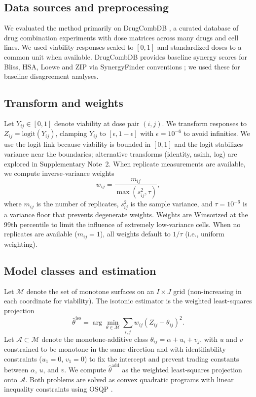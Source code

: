 \documentclass[pdflatex,sn-nature]{sn-jnl}%
\begin{document}
\subsection{Data sources and preprocessing}
We evaluated the method primarily on DrugCombDB \cite{DrugCombDB2020}, a curated database of drug combination experiments with dose matrices across many drugs and cell lines.
We used viability responses scaled to $[0,1]$ and standardized doses to a common unit when available.
DrugCombDB provides baseline synergy scores for Bliss, HSA, Loewe and ZIP via SynergyFinder conventions \cite{SynergyFinder2017}; we used these for baseline disagreement analyses.

\subsection{Transform and weights}
Let $Y_{ij}\in[0,1]$ denote viability at dose pair $(i,j)$.
We transform responses to $Z_{ij}=\mathrm{logit}(Y_{ij})$, clamping $Y_{ij}$ to $[\epsilon, 1-\epsilon]$ with $\epsilon=10^{-6}$ to avoid infinities.
We use the logit link because viability is bounded in $[0,1]$ and the logit stabilizes variance near the boundaries; alternative transforms (identity, asinh, log) are explored in Supplementary Note~2.
When replicate measurements are available, we compute inverse-variance weights
\begin{equation}
w_{ij}=\frac{m_{ij}}{\max(s^2_{ij},\tau)},
\end{equation}
where $m_{ij}$ is the number of replicates, $s^2_{ij}$ is the sample variance, and $\tau=10^{-6}$ is a variance floor that prevents degenerate weights.
Weights are Winsorized at the 99th percentile to limit the influence of extremely low-variance cells.
When no replicates are available ($m_{ij}=1$), all weights default to $1/\tau$ (i.e., uniform weighting).

\subsection{Model classes and estimation}
Let $\mathcal{M}$ denote the set of monotone surfaces on an $I\times J$ grid (non-increasing in each coordinate for viability).
The isotonic estimator is the weighted least-squares projection
\begin{equation}
\hat\theta^{\mathrm{iso}}=\arg\min_{\theta\in\mathcal{M}}\sum_{i,j} w_{ij}(Z_{ij}-\theta_{ij})^2.
\end{equation}
Let $\mathcal{A}\subset\mathcal{M}$ denote the monotone-additive class $\theta_{ij}=\alpha+u_i+v_j$, with $u$ and $v$ constrained to be monotone in the same direction and with identifiability constraints ($u_1=0$, $v_1=0$) to fix the intercept and prevent trading constants between $\alpha$, $u$, and $v$.
We compute $\hat\theta^{\mathrm{add}}$ as the weighted least-squares projection onto $\mathcal{A}$.
Both problems are solved as convex quadratic programs with linear inequality constraints using OSQP \cite{Stellato2020}.
\end{document}

